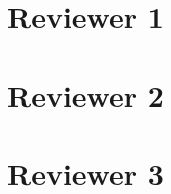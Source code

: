\documentclass[11pt,a4paper,sans]{moderncv} %
\begin{document}
\newpage

\section{Reviewer 1}



\newpage

\section{Reviewer 2}



\newpage

\section{Reviewer 3}






\end{document}
